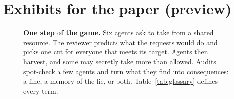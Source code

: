 \documentclass[10pt]{article}
\begin{document}
\section*{Exhibits for the paper (preview)}

\begin{figure}[H]
  \centering
  \resizebox{\textwidth}{!}{}
  \caption{\textbf{One step of the game.} Six agents ask to take from a shared resource. The reviewer predicts what the requests would do and picks one cut for everyone that meets its target. Agents then harvest, and some may secretly take more than allowed. Audits spot-check a few agents and turn what they find into consequences: a fine, a memory of the lie, or both. Table~\ref{tab:glossary} defines every term.}
  \label{fig:step}
\end{figure}

\end{document}

